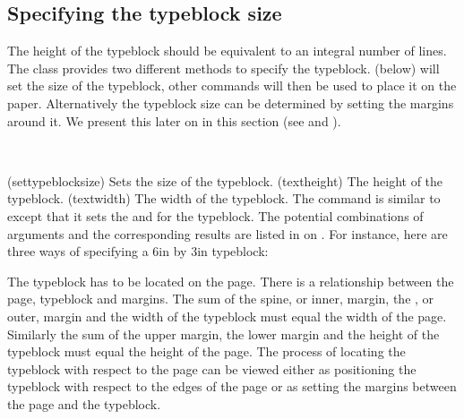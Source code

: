 \subsection{Specifying the typeblock size}
\label{sec:spec-typebl-size}




    The height of the typeblock should be 
equivalent to an integral number of lines. The class provides two
different methods to specify the typeblock. \cmd{\settypeblocksize}
(below) will set the size of the typeblock, other commands will then
be used to place it on the paper. Alternatively the typeblock size can
be determined by setting the margins around it. We present this later
on in this section (see \cmd{\setlrmarginsandblock} and
\cmd{\setulmarginsandblock}). 

\begin{syntax}
\cmd{\settypeblocksize} \\
\end{syntax}
\glossary(settypeblocksize)%
  {}%
  {Sets the size of the typeblock.}
\glossary(textheight)%
  {}%
  {The height of the typeblock.}
\glossary(textwidth)%
  {}%
  {The width of the typeblock.}
The command \cmd{\settypeblocksize} 
is similar to
\cmd{\settrimmedsize} except that it sets the \lnc{\textheight} and 
\lnc{\textwidth} for the typeblock. 
The potential combinations of arguments and the 
corresponding results are listed in  on .
For instance, here are three ways of specifying
a 6in by 3in typeblock:
\begin{lcode}
\settypeblocksize{6in}{3in}{*}
\end{lcode}

    The typeblock has to be located on the page. There is 
a relationship between the page, typeblock and 
margins. The sum of the spine, or inner, 
margin, 
the \foredge, or outer, margin 
and the width of the 
typeblock must equal the width 
of the page. 
Similarly the sum of the upper margin, 
the lower margin and the height of the 
typeblock 
must equal the height of the page. 
The process of locating the 
typeblock with respect to the page can be viewed
either as positioning the typeblock with respect to the edges 
of the page or as setting the margins between the page and the 
typeblock.

